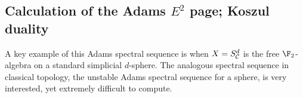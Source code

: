 \documentclass[11pt]{article}
\theoremstyle{plain}
\begin{document}
\subsection{Calculation of the Adams $E^2$ page; Koszul duality}
A key example of this Adams spectral sequence is when $X=S^d_{\mathcal{C}}$ is the free $\F_2$-algebra on a standard simplicial $d$-sphere. The analogous spectral sequence in classical topology, the unstable Adams spectral sequence for a sphere, is very interested, yet extremely difficult to compute. %
\end{document}
